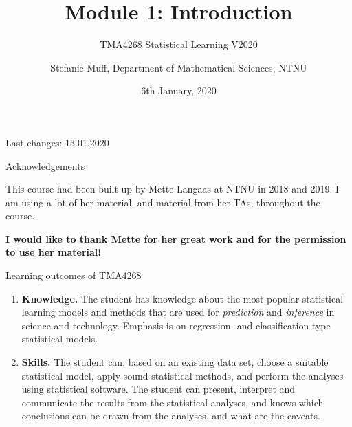 \documentclass[10pt,ignorenonframetext,]{beamer}
\title{Module 1: Introduction}
\subtitle{TMA4268 Statistical Learning V2020}
\author{Stefanie Muff, Department of Mathematical Sciences, NTNU}
\date{6th January, 2020}
\begin{document}
\frame{\titlepage}

\begin{frame}

Last changes: 13.01.2020

\end{frame}

\begin{frame}{Acknowledgements}

This course had been built up by Mette Langaas at NTNU in 2018 and 2019.
I am using a lot of her material, and material from her TAs, throughout
the course.

\textbf{I would like to thank Mette for her great work and for the
permission to use her material!}

\end{frame}

\begin{frame}{Learning outcomes of TMA4268}

\begin{enumerate}
\def\labelenumi{\arabic{enumi}.}
\item
  \textbf{Knowledge.} The student has knowledge about the most popular
  statistical learning models and methods that are used for
  \emph{prediction} and \emph{inference} in science and technology.
  Emphasis is on regression- and classification-type statistical models.
\item
  \textbf{Skills.} The student can, based on an existing data set,
  choose a suitable statistical model, apply sound statistical methods,
  and perform the analyses using statistical software. The student can
  present, interpret and communicate the results from the statistical
  analyses, and knows which conclusions can be drawn from the analyses,
  and what are the caveats.
\end{enumerate}

\end{frame}
\end{document}
